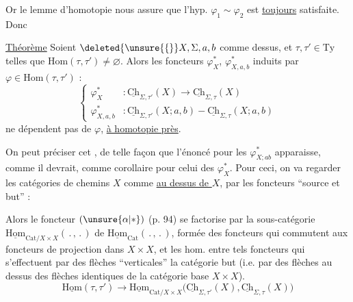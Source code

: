 Or le lemme d'homotopie nous assure que l'hyp. $\varphi_1\sim\varphi_2$ est \uline{toujours} satisfaite. Donc

\uline{Théorème}  Soient $\deleted{\unsure{\{} }X,\Sigma,a,b$ comme dessus, et $\tau,\tau'\in\mathrm{Ty}$ telles que $\mathrm{Hom}(\tau,\tau')\ne\varnothing$. Alors les foncteurs $\varphi_X^*$, $\varphi_{X,a,b}^*$ induits par  $\varphi\in\mathrm{Hom}(\tau,\tau')$ :
\[
\left\{\begin{aligned}
\varphi_X^* &: \underline{\mathrm{Ch}}_{\Sigma,\tau'}(X)\longrightarrow\underline{\mathrm{Ch}}_{\Sigma,\tau}(X)\\
\varphi_{X,a,b}^* &: \underline{\mathrm{Ch}}_{\Sigma,\tau'}(X;a,b)\mathrel{-}\underline{\mathrm{Ch}}_{\Sigma,\tau}(X;a,b)
\end{aligned}\right.
\]
ne dépendent pas de $\varphi$, \uline{à homotopie près}.

On peut préciser cet  , de telle façon que l'énoncé pour les $\varphi_{X;ab}^*$ apparaisse, comme il devrait, comme corollaire pour celui des $\varphi_X^*$. Pour ceci, on va regarder les catégories de chemins  $X$ comme  \uline{au dessus de $X$}, par les foncteurs ``source et but'' :


Alors le foncteur $(\unsure{\alpha|*})$ (p. 94)  se factorise par la sous-catégorie $\underline{\mathrm{Hom}}_{\mathrm{Cat}/X\times X}(\,.\,,\,.\,)$ de $\underline{\mathrm{Hom}}_{\mathrm{Cat}}(\,.\,,\,.\,)$, formée des foncteurs qui commutent aux foncteurs de projection dans $X\times X$, et les hom. entre tels foncteurs qui s'effectuent par des flèches ``verticales''  la catégorie but (i.e. par des flèches au dessus des flèches identiques de la catégorie base $X\times X$).
\[
\underline{\mathrm{Hom}}(\tau,\tau')\longrightarrow\underline{\mathrm{Hom}}_{\mathrm{Cat}/X\times X}
\bigl(\underline{\mathrm{Ch}}_{\Sigma,\tau'}(X),\underline{\mathrm{Ch}}_{\Sigma,\tau}(X)\bigr)
\]
\unsure{:}

